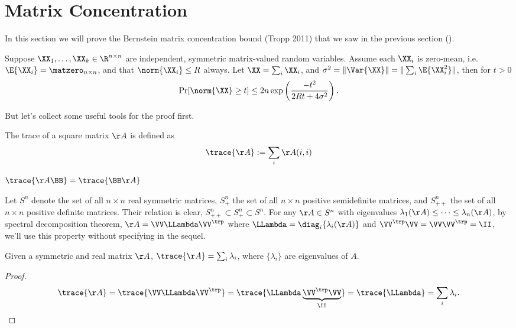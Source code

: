 \section{Matrix Concentration}
In this section we will prove the Bernstein matrix concentration bound
(Tropp 2011) that we saw in the previous section ().
\begin{theorem}\label{thm:matbernsteinagain}
  Suppose $\XX_1, \ldots, \XX_k \in \R^{n \times n}$ are independent, symmetric matrix-valued random variables.
  Assume each $\XX_i$ is zero-mean, i.e. $\E{\XX_i} = \matzero_{n \times
  n}$, and that $\norm{\XX_i} \leq R$ always.
  Let $\XX = \sum_i \XX_i$, and $\sigma^2 = \|\Var{\XX}\| = \|\sum_i \E{\XX_i^2}\|$, then for $t > 0$
  \[
  \Pr[ \norm{\XX} \geq t] \leq 2n\exp\left(\frac{-t^2}{2Rt + 4\sigma^2}\right).
  \]
\end{theorem}
But let's collect some useful tools for the proof first.

\begin{definition}[trace]
  The trace of a square matrix $\AA$ is defined as
  \[ \trace{\AA} := \sum_{i} \AA(i,i) \]
\end{definition}

\begin{claim}
  $\trace{\AA\BB} = \trace{\BB\AA}$
\end{claim}

Let $S^n$ denote the set of all $n\times n$ real symmetric matrices,
$S^n_+$ the set of all $n\times n$ positive semidefinite matrices,
and $S^n_{++}$ the set of all $n\times n$ positive definite matrices.
Their relation is clear, $S^n_{++} \subset S^n_+ \subset S^n$.
For any $\AA\in S^n$ with eigenvalues $\lambda_1(\AA)\leq\cdots\leq\lambda_n(\AA)$, by spectral decomposition theorem, $\AA = \VV\LLambda\VV^\trp$ where $\LLambda=\diag_i\{\lambda_i(\AA)\}$ and $\VV^\trp\VV=\VV\VV^\trp=\II$,
we'll use this property without specifying in the sequel.

\begin{claim}\label{clm:tr_eq_sum_eigen}
  Given a symmetric and real matrix $\AA$, $\trace{\AA} = \sum_{i}\lambda_i$, where $\{\lambda_i\}$ are eigenvalues of $A$.
\end{claim}
\begin{proof}
  \[ \trace{\AA} = \trace{\VV\LLambda\VV^\trp} = \trace{\LLambda\underbrace{\VV^\trp\VV}_{\II}} = \trace{\LLambda} = \sum_i \lambda_i. \]
\end{proof}

